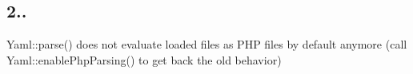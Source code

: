 \subsection*{2.. }


\begin{DoxyItemize}
\item Yaml\+::parse() does not evaluate loaded files as P\+HP files by default anymore (call Yaml\+::enable\+Php\+Parsing() to get back the old behavior) 
\end{DoxyItemize}